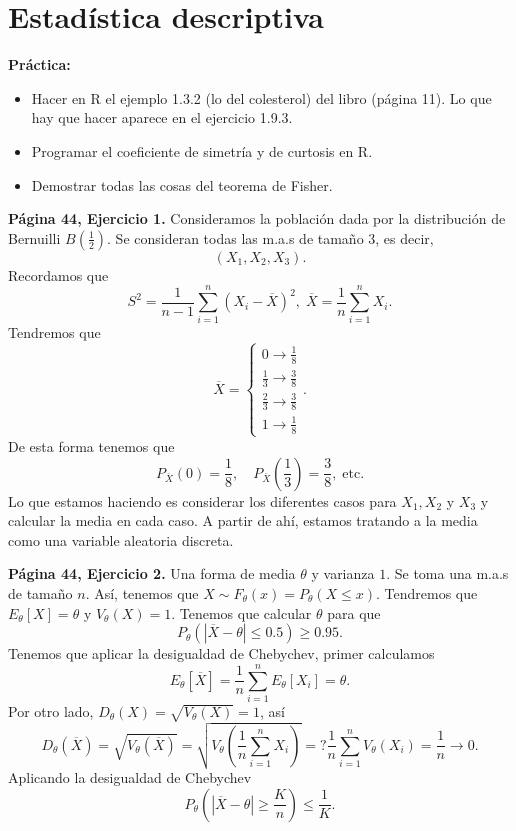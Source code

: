 \chapter{Estadística descriptiva}
\textbf{Práctica:}  
\begin{itemize}
\item Hacer en R el ejemplo 1.3.2 (lo del colesterol) del libro (página 11). Lo que hay que hacer aparece en el ejercicio 1.9.3.
\item Programar el coeficiente de simetría y de curtosis en R. 
\item Demostrar todas las cosas del teorema de Fisher.
\end{itemize}
\begin{eg}
\textbf{Página 44, Ejercicio 1.} Consideramos la población dada por la distribución de Bernuilli $\displaystyle B\left(\frac{1}{2}\right) $. Se consideran todas las m.a.s de tamaño 3, es decir,
\[ \left(X_{1}, X_{2}, X_{3}\right) .\]
Recordamos que 
\[S^{2} = \frac{1}{n-1}\sum^{n}_{i = 1}\left(X_{i}-\overline{X}\right)^{2}, \; \overline{X} = \frac{1}{n}\sum^{n}_{i = 1}X_{i} .\]
Tendremos que
\[\overline{X} = 
\begin{cases}
0 \to \frac{1}{8} \\
\frac{1}{3} \to \frac{3}{8} \\
\frac{2}{3} \to \frac{3}{8} \\
1 \to \frac{1}{8}
\end{cases}
.\]
De esta forma tenemos que
\[P_{\overline{X}}\left(0\right) = \frac{1}{8}, \quad P_{\overline{X}}\left(\frac{1}{3}\right) = \frac{3}{8}, \; \text{etc} .\]
Lo que estamos haciendo es considerar los diferentes casos para $\displaystyle X_{1}, X_{2} $ y $\displaystyle X_{3} $ y calcular la media en cada caso. A partir de ahí, estamos tratando a la media como una variable aleatoria discreta.
\end{eg}
\begin{eg}
	\textbf{Página 44, Ejercicio 2.} Una forma de media $\displaystyle \theta $ y varianza $\displaystyle 1 $. Se toma una m.a.s de tamaño $\displaystyle n $. Así, tenemos que $\displaystyle X \sim F_{\theta}\left(x\right) = P_{\theta}\left(X \leq x\right) $. Tendremos que $\displaystyle E_{\theta}\left[X\right]  = \theta $ y $\displaystyle V_{\theta }\left(X\right) = 1 $. Tenemos que calcular $\displaystyle \theta  $ para que 
	\[P_{\theta }\left( \left|\overline{X}-\theta \right| \leq 0.5\right) \geq 0.95 .\]
Tenemos que aplicar la desigualdad de Chebychev, primer calculamos
\[E_{\theta}\left[\overline{X}\right] = \frac{1}{n}\sum^{n}_{i = 1}E_{\theta}\left[X_{i}\right] = \theta  .\]
Por otro lado, $\displaystyle D_{\theta}\left(X\right) = \sqrt{V_{\theta}\left(X\right)}=1 $, así
\[D_{\theta}\left(\overline{X}\right) = \sqrt{V_{\theta}\left(\overline{X}\right)} = \sqrt{V_{\theta }\left(\frac{1}{n}\sum^{n}_{i = 1}X_{i}\right)} =? \frac{1}{n}\sum^{n}_{i = 1}V_{\theta}\left(X_{i}\right) = \frac{1}{n} \to 0 .\]
Aplicando la desigualdad de Chebychev
\[ P_{\theta}\left( \left|\overline{X}-\theta\right| \geq \frac{K}{n}\right) \leq \frac{1}{K} .\]
\end{eg}
